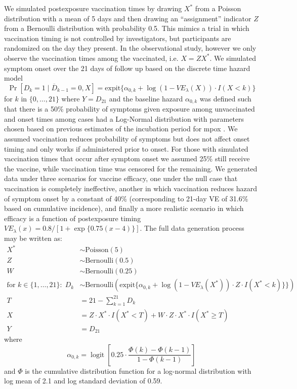 \begin{appendix}
    We simulated postexposure vaccination times by drawing $X^*$ from a Poisson distribution with a mean of 5 days and then drawing an ``assignment'' indicator $Z$ from a Bernoulli distribution with probability 0.5. This mimics a trial in which vaccination timing is not controlled by investigators, but participants are randomized on the day they present. In the observational study, however we only observe the vaccination times among the vaccinated, i.e. $X = ZX^* $. We simulated symptom onset over the 21 days of follow up based on the discrete time hazard model 
    $$\Pr[D_k = 1 \mid \overline{D}_{k-1} = 0, X] =  \text{expit}\{\alpha_{0,k} + \log(1 - VE_{\lambda}(X)) \cdot I(X < k)\}$$
    for $k$ in $\{0, \ldots, 21\}$ where $Y = D_{21}$ and the baseline hazard $\alpha_{0,k}$ was defined such that there is a 50\% probability of symptoms given exposure among unvaccinated and onset times among cases had a Log-Normal distribution with parameters chosen based on previous estimates of the incubation period for mpox \cite{miura_estimated_2022}. We assumed vaccination reduces probability of symptoms but does not affect onset timing and only works if administered prior to onset. For those with simulated vaccination times that occur after symptom onset we assumed 25\% still receive the vaccine, while vaccination time was censored for the remaining. We generated data under three scenarios for vaccine efficacy, one under the null case that vaccination is completely ineffective, another in which vaccination reduces hazard of symptom onset by a constant of 40\% (corresponding to 21-day VE of 31.6\% based on cumulative incidence), and finally a more realistic scenario in which efficacy is a function of postexposure timing $VE_{\lambda}(x) = 0.8/[1+\exp\{0.75(x-4)\}]$. The full data generation process may be written as:
    \begin{align*}
        X^* & \sim \text{Poisson}(5) \\
        Z & \sim \text{Bernoulli}(0.5) \\
        W & \sim \text{Bernoulli}(0.25) \\
        \text{for } k \in \{1, \ldots, 21\}: \; D_k & \sim \text{Bernoulli}(\text{expit}\{\alpha_{0,k} + \log(1 - VE_{\lambda}(X^*)) \cdot Z \cdot I(X^* < k)\}\}) \\
        T &= 21 - \sum_{k=1}^{21} D_k \\
        X &= Z \cdot X^* \cdot I(X^* < T) + W \cdot Z \cdot X^* \cdot I(X^* \geq T) \\
        Y &= D_{21}
    \end{align*}
    where 
    $$\alpha_{0,k} = \operatorname{logit}\left[0.25 \cdot \frac{\Phi(k) - \Phi(k -1)}{1 - \Phi(k-1)}\right]$$
    and $\Phi$ is the cumulative distribution function for a log-normal distribution with log mean of 2.1 and log standard deviation of 0.59.
    

\end{appendix}
